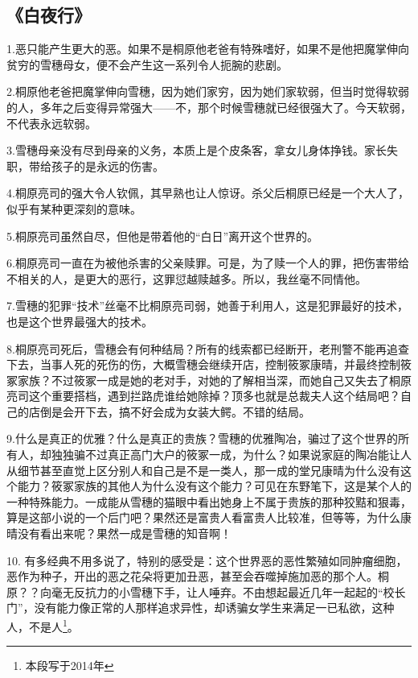 \subsection{《白夜行》}
1.恶只能产生更大的恶。如果不是桐原他老爸有特殊嗜好，如果不是他把魔掌伸向贫穷的雪穗母女，便不会产生这一系列令人扼腕的悲剧。

2.桐原他老爸把魔掌伸向雪穗，因为她们家穷，因为她们家软弱，但当时觉得软弱的人，多年之后变得异常强大——不，那个时候雪穗就已经很强大了。今天软弱，不代表永远软弱。

3.雪穗母亲没有尽到母亲的义务，本质上是个皮条客，拿女儿身体挣钱。家长失职，带给孩子的是永远的伤害。

4.桐原亮司的强大令人钦佩，其早熟也让人惊讶。杀父后桐原已经是一个大人了，似乎有某种更深刻的意味。

5.桐原亮司虽然自尽，但他是带着他的“白日”离开这个世界的。

6.桐原亮司一直在为被他杀害的父亲赎罪。可是，为了赎一个人的罪，把伤害带给不相关的人，是更大的恶行，这罪愆越赎越多。所以，我丝毫不同情他。

7.雪穗的犯罪“技术”丝毫不比桐原亮司弱，她善于利用人，这是犯罪最好的技术，也是这个世界最强大的技术。

8.桐原亮司死后，雪穗会有何种结局？所有的线索都已经断开，老刑警不能再追查下去，当事人死的死伤的伤，大概雪穗会继续开店，控制筱冢康晴，并最终控制筱冢家族？不过筱冢一成是她的老对手，对她的了解相当深，而她自己又失去了桐原亮司这个重要搭档，遇到拦路虎谁给她除掉？顶多也就是总裁夫人这个结局吧？自己的店倒是会开下去，搞不好会成为女装大鳄。不错的结局。

9.什么是真正的优雅？什么是真正的贵族？雪穗的优雅陶冶，骗过了这个世界的所有人，却独独骗不过真正高门大户的筱冢一成，为什么？如果说家庭的陶冶能让人从细节甚至直觉上区分别人和自己是不是一类人，那一成的堂兄康晴为什么没有这个能力？筱冢家族的其他人为什么没有这个能力？可见在东野笔下，这是某个人的一种特殊能力。一成能从雪穗的猫眼中看出她身上不属于贵族的那种狡黠和狠毒，算是这部小说的一个后门吧？果然还是富贵人看富贵人比较准，但等等，为什么康晴没有看出来呢？果然一成是雪穗的知音啊！

10. 有多经典不用多说了，特别的感受是：这个世界恶的恶性繁殖如同肿瘤细胞，恶作为种子，开出的恶之花朵将更加丑恶，甚至会吞噬掉施加恶的那个人。桐原？？向毫无反抗力的小雪穗下手，让人唾弃。不由想起最近几年一起起的“校长门”，没有能力像正常的人那样追求异性，却诱骗女学生来满足一已私欲，这种人，不是人\footnote{本段写于2014年}。


